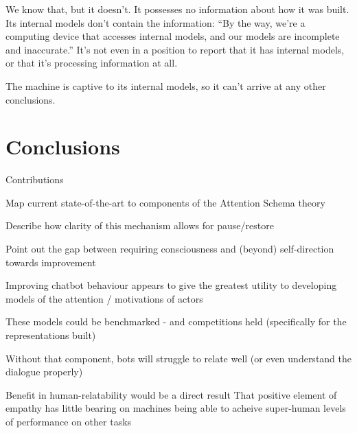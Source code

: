 \documentclass[citeauthoryear]{llncs}
\begin{document}
We know that, but it doesn't. It possesses no information about how it was built. 
Its internal models don't contain the information: ``By the way, we're a computing device that 
accesses internal models, and our models are incomplete and inaccurate.''
It's not even in a position to report that it has internal models, or that it's processing information at all.
 
The machine is captive to its internal models, so it can't arrive at any other conclusions.



\section{Conclusions}

Contributions

	Map current state-of-the-art to components of the Attention Schema theory

	Describe how clarity of this mechanism allows for pause/restore

	Point out the gap between requiring consciousness and (beyond) self-direction towards improvement




Improving chatbot behaviour appears to give the greatest utility to developing models of the attention / motivations of actors

  These models could be benchmarked - and competitions held (specifically for the representations built)
  
  Without that component, bots will struggle to relate well (or even understand the dialogue properly)
  
  Benefit in human-relatability would be a direct result
    That positive element of empathy has little bearing on machines being able to acheive super-human levels of performance on other tasks
\end{document}
